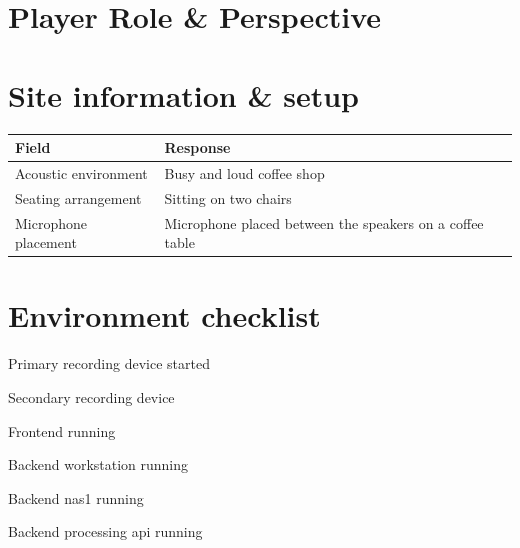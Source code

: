 
\section{Player Role \& Perspective}

\section{Site information \& setup}
\begin{table}[h]
\centering
\begin{tabular}{|p{5cm}|p{10cm}|}
\hline
\textbf{Field} & \textbf{Response} \\ \hline
Acoustic environment & Busy and loud coffee shop \\[1.5cm] \hline
Seating arrangement & Sitting on two chairs \\[1.5cm] \hline
Microphone placement & Microphone placed between the speakers on a coffee table\\[1.5cm] \hline
\end{tabular}
\end{table}

\section{Environment checklist}
    \begin{todolist}
    \item[\done] Primary recording device started
    \item[\done] Secondary recording device
    \item[\done] Frontend running
    \item[\done] Backend workstation running
    \item[\done] Backend nas1 running
    \item[\done] Backend processing api running
    \end{todolist}

